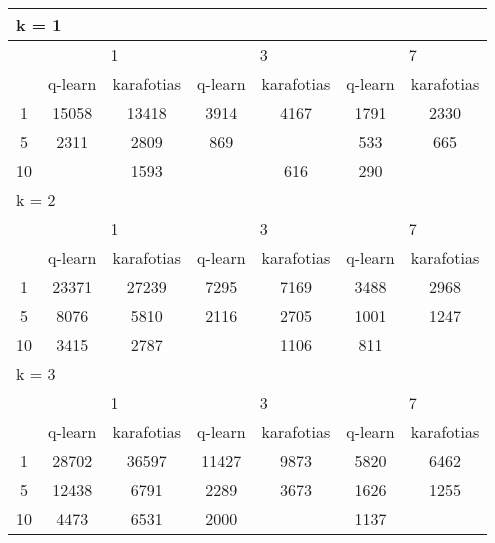 \begin{table}
  \centering
  \begin{tabular}{|*7{c|}}
    \hline
    \multicolumn{7}{|l|}{k = 1} \\
    \hline
    \multirow{2}{*}{\diagbox{$\mu$}{$\lambda$}} & \multicolumn{2}{c|}{1} & \multicolumn{2}{c|}{3} & \multicolumn{2}{c|}{7} \\
    \cline{2-7}
    & q-learn & karafotias & q-learn & karafotias & q-learn & karafotias \\
    \hline
    1 & 15058 & 13418 & 3914 & 4167 & 1791 & 2330 \\
    \hline
    5 & 2311 & 2809 & 869& \cellcolor{olive}{748} & 533 & 665 \\
    \hline
    10 & \cellcolor{olive}{1497} & 1593& \cellcolor{olive}{488} & 616 & 290& \cellcolor{olive}{235} \\
    \hline
    \multicolumn{7}{|l|}{k = 2} \\
    \hline
    \multirow{2}{*}{\diagbox{$\mu$}{$\lambda$}} & \multicolumn{2}{c|}{1} & \multicolumn{2}{c|}{3} & \multicolumn{2}{c|}{7} \\
    \cline{2-7}
    & q-learn & karafotias & q-learn & karafotias & q-learn & karafotias \\
    \hline
    1 & 23371 & 27239 & 7295 & 7169 & 3488 & 2968 \\
    \hline
    5 & 8076 & 5810 & 2116 & 2705 & 1001 & 1247 \\
    \hline
    10 & 3415 & 2787& \cellcolor{olive}{1037} & 1106 & 811& \cellcolor{olive}{666} \\
    \hline
    \multicolumn{7}{|l|}{k = 3} \\
    \hline
    \multirow{2}{*}{\diagbox{$\mu$}{$\lambda$}} & \multicolumn{2}{c|}{1} & \multicolumn{2}{c|}{3} & \multicolumn{2}{c|}{7} \\
    \cline{2-7}
    & q-learn & karafotias & q-learn & karafotias & q-learn & karafotias \\
    \hline
    1 & 28702 & 36597 & 11427 & 9873 & 5820 & 6462 \\
    \hline
    5 & 12438 & 6791 & 2289 & 3673 & 1626 & 1255 \\
    \hline
    10 & 4473 & 6531 & 2000 & \cellcolor{olive}{1650} & 1137 & \cellcolor{olive}{1098} \\
    \hline
  \end{tabular}
\end{table}

